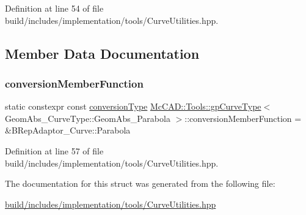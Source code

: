 Definition at line 54 of file build/includes/implementation/tools/\+Curve\+Utilities.\+hpp.



\subsection{Member Data Documentation}
\mbox{\label{structMcCAD_1_1Tools_1_1gpCurveType_3_01GeomAbs__CurveType_1_1GeomAbs__Parabola_01_4_abda59552caac58297eb8add53cc29bdd}} 
\subsubsection{\texorpdfstring{conversion\+Member\+Function}{conversionMemberFunction}}
{\footnotesize\ttfamily static constexpr const \hyperlink{structMcCAD_1_1Tools_1_1gpCurveType_3_01GeomAbs__CurveType_1_1GeomAbs__Parabola_01_4_a39895972416d7cbcd11ba78c5dd3d745}{conversion\+Type} \hyperlink{structMcCAD_1_1Tools_1_1gpCurveType}{Mc\+C\+A\+D\+::\+Tools\+::gp\+Curve\+Type}$<$ Geom\+Abs\+\_\+\+Curve\+Type\+::\+Geom\+Abs\+\_\+\+Parabola $>$\+::conversion\+Member\+Function = \&B\+Rep\+Adaptor\+\_\+\+Curve\+::\+Parabola\hspace{0.3cm}{\ttfamily [static]}}



Definition at line 57 of file build/includes/implementation/tools/\+Curve\+Utilities.\+hpp.



The documentation for this struct was generated from the following file\+:\begin{DoxyCompactItemize}
\item 
\hyperlink{build_2includes_2implementation_2tools_2CurveUtilities_8hpp}{build/includes/implementation/tools/\+Curve\+Utilities.\+hpp}\end{DoxyCompactItemize}
